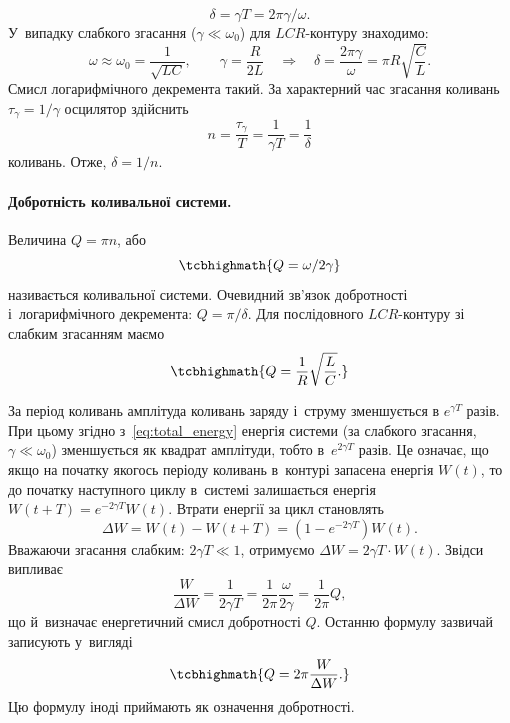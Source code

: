 \begin{equation*}
	\delta = \gamma T = 2\pi\gamma/\omega.
\end{equation*}
У~випадку слабкого згасання ($\gamma \ll \omega_0$) для $LCR$-контуру знаходимо:
\begin{equation*}
	\omega \approx \omega_0 = \frac{1}{\sqrt{LC}}, \qquad
	\gamma = \frac{R}{2L}
	\quad\Rightarrow\quad
	\delta = \frac{2\pi\gamma}{\omega} = \pi R \sqrt{\frac{C}{L}}.
\end{equation*}
Смисл логарифмічного декремента такий. За характерний
час згасання коливань $\tau_\gamma = 1/\gamma$ осцилятор здійснить
\begin{equation*}
	n = \frac{\tau_\gamma}{T} = \frac{1}{\gamma T} = \frac{1}{\delta}
\end{equation*}
коливань. Отже, $\delta = 1/n$.

\paragraph*{Добротність коливальної системи.}
Величина $Q = \pi n$, або
\begin{equation*}
	\tcbhighmath{
		Q = \omega/2\gamma
	}
\end{equation*}
називається  коливальної системи. Очевидний зв'язок
добротності і~логарифмічного декремента: $Q = \pi/\delta$. Для послідовного $LCR$-контуру зі слабким згасанням маємо
\begin{equation}\label{eq:Q_LCR}
	\tcbhighmath{
		Q = \frac{1}{R}\sqrt{\frac{L}{C}}.
	}
\end{equation}

За період коливань амплітуда коливань заряду і~струму зменшується в
$e^{\gamma T}$ разів. При цьому згідно з~\eqref{eq:total_energy} енергія системи (за слабкого згасання, $\gamma \ll \omega_0$) зменшується як квадрат амплітуди, тобто в~$e^{2\gamma T}$ разів. Це означає, що якщо на початку якогось періоду коливань в~контурі запасена енергія $W(t)$, то до початку
наступного циклу в~системі залишається енергія $W(t + T) = e^{-2\gamma T}W(t)$. Втрати енергії за цикл становлять
\begin{equation*}
	\Delta W = W(t) - W(t + T) = \left(1 - e^{-2\gamma T}\right)W(t).
\end{equation*}
Вважаючи згасання слабким: $2\gamma T \ll 1$, отримуємо $\Delta W = 2\gamma T \cdot W(t)$. Звідси
випливає
\begin{equation*}
	\frac{W}{\Delta W} = \frac{1}{2\gamma T} = \frac{1}{2\pi}\frac{\omega}{2\gamma} = \frac{1}{2\pi}Q,
\end{equation*}
що й~визначає енергетичний смисл добротності $Q$. Останню
формулу зазвичай записують у~вигляді
\begin{equation*}
	\tcbhighmath{
		Q = 2\pi\frac{W}{\Delta W}.
	}
\end{equation*}
Цю формулу іноді приймають як означення добротності.

